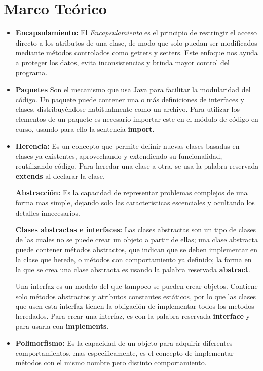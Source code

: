 \documentclass[letterpaper,12pt]{article}
\begin{document}
\section{Marco Teórico}
    \begin{itemize}

    \item \textbf{Encapsulamiento: }El \textit{Encapsulamiento} es el principio de restringir el acceso directo a los atributos de una clase, de modo que solo puedan ser modificados mediante métodos controlados como getters y setters. Este enfoque nos ayuda a proteger los datos, evita inconsistencias y brinda mayor control del programa.~\cite{Encapsulamiento}
    
    \item \textbf{Paquetes} Son el mecanismo que usa Java para facilitar la modularidad del código. Un paquete puede contener una o más definiciones de interfaces y clases, distribuyéndose habitualmente como un archivo. Para utilizar los elementos de un paquete es necesario importar este en el módulo de código en curso, usando para ello la sentencia \textbf{import}. ~\cite{Paquetes}
    
    \item \textbf {Herencia:} Es un concepto que permite definir nuevas clases basadas en clases ya existentes, aprovechando y extendiendo su funcionalidad, reutilizando código. Para heredar una clase a otra, se usa la palabra reservada \textbf{extends} al declarar la clase. ~\cite{HerenciaPolimorfismo}

    \textbf{Abstracción: }Es la capacidad de representar problemas complejos de una forma mas simple, dejando solo las caracteristicas escenciales y ocultando los detalles innecesarios. ~\cite{ClasesAbstractasInterfaces}
    
    \textbf {Clases abstractas e interfaces: }Las clases abstractas son un tipo de clases de las cuales no se puede crear un objeto a partir de ellas; una clase abstracta puede contener métodos abstractos, que indican que se deben implementar en la clase que herede, o métodos con comportamiento ya definido; la forma en la que se crea una clase abstracta es usando la palabra reservada \textbf{abstract}.

    Una interfaz es un modelo del que tampoco se pueden crear objetos. Contiene solo métodos abstractos y atributos constantes estáticos, por lo que las clases que usen esta interfaz tienen la obligación de implementar todos los metodos heredados. Para crear una interfaz, es con la palabra reservada \textbf{interface} y para usarla con \textbf{implements}. ~\cite{ClasesAbstractasInterfaces}
        
    \item \textbf{Polimorfismo: }Es la capacidad de un objeto para adquirir diferentes comportamientos, mas específicamente, es el concepto de implementar métodos con el mismo nombre pero distinto comportamiento. ~\cite{HerenciaPolimorfismo}
    
\end{itemize}
\end{document}

